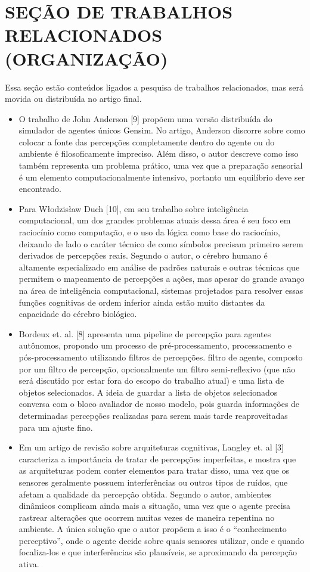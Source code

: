 \iffalse
\newpage
\section{SEÇÃO DE TRABALHOS RELACIONADOS (ORGANIZAÇÃO)}

Essa seção estão conteúdos ligados a pesquisa de trabalhos relacionados, mas será movida ou distribuída no artigo final.

\begin{itemize}
    \item O trabalho de John Anderson [9] propõem uma versão distribuída do simulador de agentes únicos Gensim. No artigo, Anderson discorre sobre como colocar a fonte das percepções completamente dentro do agente ou do ambiente é filosoficamente impreciso. Além disso, o autor descreve como isso também representa um problema prático, uma vez que a preparação sensorial é um elemento computacionalmente intensivo, portanto um equilíbrio deve ser encontrado.
    
    \item Para Włodzisław Duch [10], em seu trabalho sobre inteligência computacional, um dos grandes problemas atuais dessa área é seu foco em raciocínio como computação, e o uso da lógica como base do raciocínio, deixando de lado o caráter técnico de como símbolos precisam primeiro serem derivados de percepções reais. Segundo o autor, o cérebro humano é altamente especializado em análise de padrões naturais e outras técnicas que permitem o mapeamento de percepções a ações, mas apesar do grande avanço na área de inteligência computacional, sistemas projetados para resolver essas funções cognitivas de ordem inferior ainda estão muito distantes da capacidade do cérebro biológico.
    
    \item Bordeux et. al. [8] apresenta uma pipeline de percepção para agentes autônomos, propondo um processo de pré-processamento, processamento e pós-processamento utilizando filtros de percepções. filtro de agente, composto por um filtro de percepção, opcionalmente um filtro semi-reflexivo (que não será discutido por estar fora do escopo do trabalho atual) e uma lista de objetos selecionados. A ideia de guardar a lista de objetos selecionados conversa com o bloco avaliador de nosso modelo, pois guarda informações de determinadas percepções realizadas para serem mais tarde reaproveitadas para um ajuste fino.
    
    \item Em um artigo de revisão sobre arquiteturas cognitivas, Langley et. al [3] caracteriza a importância de tratar de percepções imperfeitas, e mostra que as arquiteturas podem conter elementos para tratar disso, uma vez que os sensores geralmente possuem interferências ou outros tipos de ruídos, que afetam a qualidade da percepção obtida. Segundo o autor, ambientes dinâmicos complicam ainda mais a situação, uma vez que o agente precisa rastrear alterações que ocorrem muitas vezes de maneira repentina no ambiente. A única solução que o autor propõem a isso é o “conhecimento perceptivo”, onde o agente decide sobre quais sensores utilizar, onde e quando focaliza-los e que interferências são plausíveis, se aproximando da percepção ativa.
    

\end{itemize}
